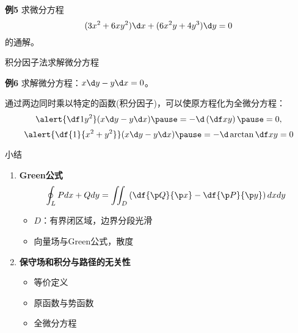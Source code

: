 \begin{frame}
	\linespread{1.2}
	\begin{exampleblock}{{\bf 例5}\hfill}
		求微分方程
		$$(3x^2+6xy^2)\d x+(6x^2y+4y^3)\d y=0$$
		的通解。
	\end{exampleblock}
\end{frame}

\begin{frame}{积分因子法求解微分方程}
	\linespread{1.2}
	\begin{exampleblock}{{\bf 例6}\hfill}
		求解微分方程：$x\d y-y\d x=0$。
	\end{exampleblock}
	\pause 通过两边同时乘以特定的函数({\bb 积分因子})，可以使原方程化为全微分方程：\pause
	$$\alert{\df 1{y^2}}(x\d y-y\d x)\pause =-\d\left(\df xy\right)\pause
	=0,$$\pause
	\vspace{-1em}
	$$\alert{\df{1}{x^2+y^2}}(x\d y-y\d x)\pause =-\d\arctan\df xy=0$$
\end{frame}

\begin{frame}[<+->]{小结}
	\linespread{1.4}
	\begin{enumerate}
	  \item {\bf Green公式}
	  $$\oint_LPdx+Qdy=\iint_D\left(
		\df{\p Q}{\p x}-\df{\p P}{\p y}\right)dxdy$$
	  \vspace{-1em}
	  \begin{itemize}
	    \item $D$：有界闭区域，边界分段光滑
	    \item 向量场与Green公式，散度
	  \end{itemize}
	  \item {\bf 保守场和积分与路径的无关性}
	  \begin{itemize}
	    \item 等价定义
	    \item 原函数与势函数
	    \item 全微分方程
	  \end{itemize}
	\end{enumerate}
\end{frame}


% 

